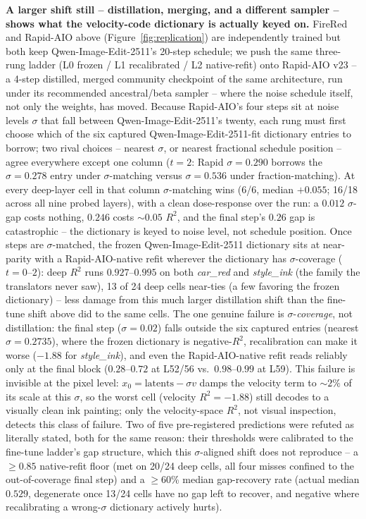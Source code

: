 \documentclass[10pt,twocolumn]{article}
\newcommand{\model}{Qwen-Image-Edit-2511}
\begin{document}
\textbf{A larger shift still -- distillation, merging, and a different
sampler -- shows what the velocity-code dictionary is actually keyed
on.} FireRed and Rapid-AIO above (Figure~\ref{fig:replication}) are
independently trained but both keep \model{}'s 20-step schedule; we
push the same three-rung ladder (L0 frozen / L1 recalibrated / L2
native-refit) onto Rapid-AIO v23 -- a 4-step distilled, merged
community checkpoint of the same architecture, run under its
recommended ancestral/beta sampler -- where the noise schedule itself,
not only the weights, has moved. Because Rapid-AIO's four steps sit at
noise levels $\sigma$ that fall between \model{}'s twenty, each rung
must first choose which of the six captured \model{}-fit dictionary
entries to borrow; two rival choices -- nearest $\sigma$, or nearest
fractional schedule position -- agree everywhere except one column
($t{=}2$: Rapid $\sigma=0.290$ borrows the $\sigma=0.278$ entry under
$\sigma$-matching versus $\sigma=0.536$ under fraction-matching). At
every deep-layer cell in that column $\sigma$-matching wins (6/6,
median $+0.055$; 16/18 across all nine probed layers), with a clean
dose-response over the run: a $0.012$ $\sigma$-gap costs nothing,
$0.246$ costs ${\sim}0.05$ $R^2$, and the final step's $0.26$ gap is
catastrophic -- the dictionary is keyed to noise level, not schedule
position. Once steps are $\sigma$-matched, the frozen \model{}
dictionary sits at near-parity with a Rapid-AIO-native refit wherever
the dictionary has $\sigma$-coverage ($t{=}0$--$2$): deep $R^2$ runs
$0.927$--$0.995$ on both \emph{car\_red} and \emph{style\_ink} (the
family the translators never saw), 13 of 24 deep cells near-ties (a
few favoring the frozen dictionary) -- less damage from this much
larger distillation shift than the fine-tune shift above did to the
same cells. The one genuine failure is $\sigma$-\emph{coverage}, not
distillation: the final step ($\sigma=0.02$) falls outside the six
captured entries (nearest $\sigma=0.2735$), where the frozen dictionary
is negative-$R^2$, recalibration can make it worse ($-1.88$ for
\emph{style\_ink}), and even the Rapid-AIO-native refit reads reliably
only at the final block ($0.28$--$0.72$ at L52/56 vs.\
$0.98$--$0.99$ at L59). This
failure is invisible at the pixel level: $x_0=\text{latents}-\sigma v$
damps the velocity term to ${\sim}2\%$ of its scale at this $\sigma$,
so the worst cell (velocity $R^2=-1.88$) still decodes to a visually
clean ink painting; only the velocity-space $R^2$, not visual
inspection, detects this class of failure. Two of five pre-registered
predictions were refuted as literally stated, both for the same
reason: their thresholds were calibrated to the fine-tune ladder's gap
structure, which this $\sigma$-aligned shift does not reproduce -- a
$\ge0.85$ native-refit floor (met on 20/24 deep cells, all four misses
confined to the out-of-coverage final step) and a $\ge$60\% median
gap-recovery rate (actual median $0.529$, degenerate once 13/24 cells
have no gap left to recover, and negative where recalibrating a
wrong-$\sigma$ dictionary actively hurts).
\end{document}
